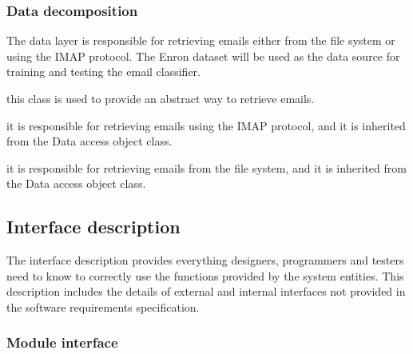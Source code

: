 \subsubsection{Data decomposition}
The data layer is responsible for retrieving emails either from the file system or using 
the IMAP protocol. The Enron dataset \cite{ENRON} will be used as the data source for training and 
testing the email classifier.

\begin{my_desc}
  \item[Data access object] this class is used to provide an abstract way to retrieve emails.
  \item[IMAP Data access object] it is responsible for retrieving emails using the IMAP protocol,
  and it is inherited from the Data access object class.
  \item[File system data access object] it is responsible for retrieving emails from the file
  system, and it is inherited from the Data access object class.
\end{my_desc}


\subsection{Interface description}
The interface description provides everything designers, programmers and 
testers need to know to correctly use the functions provided by the system 
entities. This description includes the details of external and internal 
interfaces not provided in the software requirements specification.

\subsubsection{Module interface}
